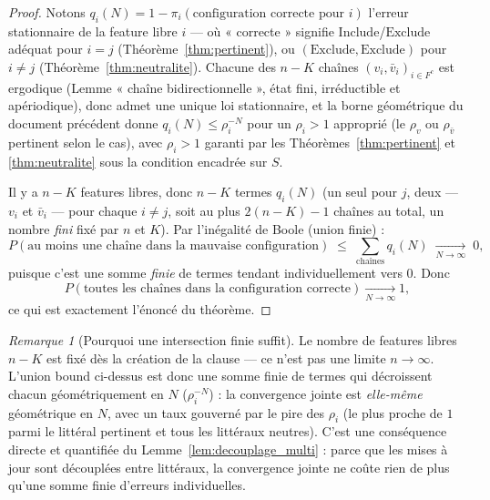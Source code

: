 \documentclass[12pt,a4paper]{article}
\theoremstyle{remark}
\newtheorem{remark}{Remarque}[section]
\newcommand{\Inc}{\ensuremath{\mathrm{Include}}}
\newcommand{\Exc}{\ensuremath{\mathrm{Exclude}}}
\newcommand{\vbar}{\bar{v}}
\begin{document}
\begin{proof}
Notons $q_i(N) = 1-\pi_i(\text{configuration correcte pour }i)$ l'erreur
stationnaire de la feature libre $i$ --- où « correcte » signifie \Inc/\Exc{}
adéquat pour $i=j$ (Théorème~\ref{thm:pertinent}), ou $(\Exc,\Exc)$ pour
$i\ne j$ (Théorème~\ref{thm:neutralite}). Chacune des $n-K$ chaînes
$(v_i,\vbar_i)_{i\in F^c}$ est ergodique (Lemme « chaîne bidirectionnelle », état
fini, irréductible et apériodique), donc admet une unique loi stationnaire, et la
borne géométrique du document précédent donne $q_i(N) \le \rho_i^{-N}$ pour un
$\rho_i>1$ approprié (le $\rho_v$ ou $\rho_{\vbar}$ pertinent selon le cas), avec
$\rho_i>1$ garanti par les Théorèmes~\ref{thm:pertinent} et \ref{thm:neutralite}
sous la condition encadrée sur $S$.

Il y a $n-K$ features libres, donc $n-K$ termes $q_i(N)$ (un seul pour $j$, deux
--- $v_i$ et $\vbar_i$ --- pour chaque $i\ne j$, soit au plus $2(n-K)-1$ chaînes
au total, un nombre \emph{fini} fixé par $n$ et $K$). Par l'inégalité de
Boole (union finie) :
\[
  P(\text{au moins une chaîne dans la mauvaise configuration})
  \;\le\; \sum_{\text{chaînes}} q_i(N)
  \;\xrightarrow[N\to\infty]{}\; 0,
\]
puisque c'est une somme \emph{finie} de termes tendant individuellement vers $0$.
Donc
\[
  P(\text{toutes les chaînes dans la configuration correcte}) \xrightarrow[N\to\infty]{} 1,
\]
ce qui est exactement l'énoncé du théorème.
\end{proof}

\begin{remark}[Pourquoi une intersection finie suffit]
Le nombre de features libres $n-K$ est fixé dès la création de la clause --- ce
n'est pas une limite $n\to\infty$. L'union bound ci-dessus est donc une somme
finie de termes qui décroissent chacun géométriquement en $N$ ($\rho_i^{-N}$) :
la convergence jointe est \emph{elle-même} géométrique en $N$, avec un taux
gouverné par le pire des $\rho_i$ (le plus proche de $1$ parmi le littéral
pertinent et tous les littéraux neutres). C'est une conséquence directe et
quantifiée du Lemme~\ref{lem:decouplage_multi} : parce que les mises à jour sont
découplées entre littéraux, la convergence jointe ne coûte rien de plus qu'une
somme finie d'erreurs individuelles.
\end{remark}
\end{document}
